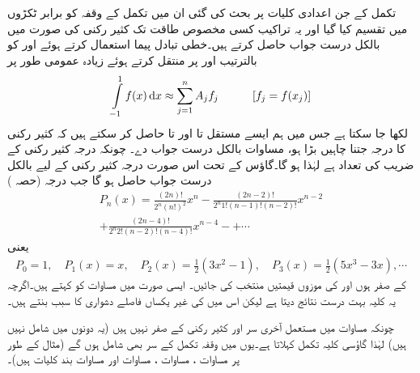 تکمل کے جن اعدادی کلیات پر بحث کی گئی ان میں تکمل کے وقفہ کو برابر ٹکڑوں میں تقسیم کیا گیا اور یہ تراکیب کسی مخصوص طاقت تک کثیر رکنی کی صورت میں بالکل درست جواب حاصل کرتے ہیں۔خطی تبادل پیما استعمال کرتے ہوئے  اور  کو بالترتیب  اور  پر منتقل کرتے ہوئے زیادہ عمومی طور پر
\begin{align}\label{مساوات_اعدادی_قاعدہ_عمومی_الف}
\int\limits_{-1}^{1}f(x)\dif x\approx \sum\limits_{j=1}^{n} A_jf_j\quad \quad \quad [f_j=f(x_j)]
\end{align}   
لکھا جا سکتا ہے جس میں ہم ایسے  مستقل  تا  اور  تا  حاصل کر سکتے ہیں کہ کثیر رکنی کا درجہ  جتنا چاہیں بڑا ہو، مساوات  بالکل درست جواب دے۔ چونکہ درجہ  کثیر رکنی کے  ضریب  کی تعداد  ہے لہٰذا  ہو گا۔گاؤس کے تحت اس صورت درجہ  کثیر رکنی کے لیے  بالکل درست جواب حاصل ہو گا جب  درجہ   (حصہ )
\begin{multline*}
P_n(x)=\frac{(2n)!}{2^n(n!)^2}x^n-\frac{(2n-2)!}{2^n 1!(n-1)!(n-2)!}x^{n-2}\\
+\frac{(2n-4)!}{2^n2!(n-2)!(n-4)!}x^{n-4}-+\cdots
\end{multline*}
یعنی
\begin{align*}
P_0=1,\quad P_1(x)=x,\quad P_2(x)=\frac{1}{2}(3x^2-1),\quad P_3(x)=\frac{1}{2}(5x^3-3x),\cdots
\end{align*}
 کے  صفر ہوں اور   کی موزوں قیمتیں منتخب کی جائیں۔ ایسی صورت میں مساوات  کو  کہتے ہیں۔اگرچہ یہ کلیہ بہت درست نتائج دیتا ہے لیکن اس میں  کی غیر یکساں فاصلے  دشواری کا سبب بنتے ہیں۔

چونکہ مساوات  میں مستعمل آخری سر  اور  کثیر رکنی  کے صفر نہیں ہیں (یہ دونوں  میں شامل نہیں ہیں) لہٰذا گاؤسی کلیہ تکمل  کہلاتا ہے۔یوں  میں وقفہ تکمل کے سر بھی شامل ہوں گے (مثال کے طور پر مساوات ، مساوات ، مساوات  اور مساوات  بند کلیات ہیں)۔  


